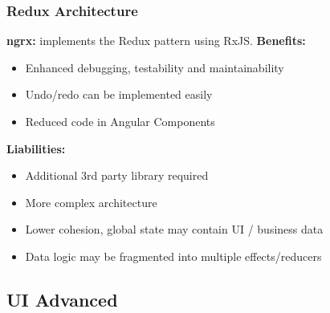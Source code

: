 \subsubsection{Redux Architecture}
\textbf{ngrx:} implements the Redux pattern using RxJS.
\textbf{Benefits:}
\begin{itemize}
    \item Enhanced debugging, testability and maintainability
    \item Undo/redo can be implemented easily
    \item Reduced code in Angular Components
\end{itemize}
\textbf{Liabilities:}
\begin{itemize}
    \item Additional 3rd party library required
    \item More complex architecture
    \item Lower cohesion, global state may contain UI / business data
    \item Data logic may be fragmented into multiple effects/reducers
\end{itemize}

\subsection{UI Advanced}
